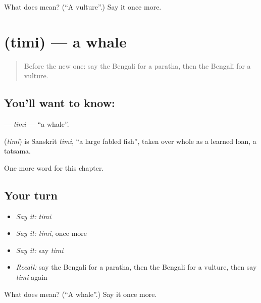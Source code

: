 \begin{tcolorbox}[breakable,colback=teal!4,colframe=teal!35!black,title={Before you move on}]
What does  mean? (\textquotedblleft{}A vulture\textquotedblright{}.) Say it once more.
\end{tcolorbox}
\section[\texorpdfstring{\bn{তিমি} (timi)}{তিমি (timi)}]{ (timi) — a whale}

\label{lesson:BN-C166-timi}



\begin{quote}
Before the new one: say the Bengali for a paratha, then the Bengali for a vulture.
\end{quote}

\subsection*{You'll want to know: }
\textbf{} — \emph{timi} — \textquotedblleft{}a whale\textquotedblright{}.

\begin{cousinweb}
\textbf{} (\emph{timi}) is Sanskrit \emph{timi}, \textquotedblleft{}a large fabled fish\textquotedblright{}, taken over whole as a learned loan, a tatsama.
\end{cousinweb}

\begin{grammarlens}[title={What you've built}]
One more word for this chapter.
\end{grammarlens}

\subsection*{Your turn}
\begin{itemize}
\raggedright
  \item \emph{Say it:} \emph{timi}
  \item \emph{Say it:} \emph{timi}, once more
  \item \emph{Say it:} say \emph{timi}
  \item \emph{Recall:} say the Bengali for a paratha, then the Bengali for a vulture, then say \emph{timi} again
\end{itemize}

\begin{tcolorbox}[breakable,colback=teal!4,colframe=teal!35!black,title={Before you move on}]
What does  mean? (\textquotedblleft{}A whale\textquotedblright{}.) Say it once more.
\end{tcolorbox}
